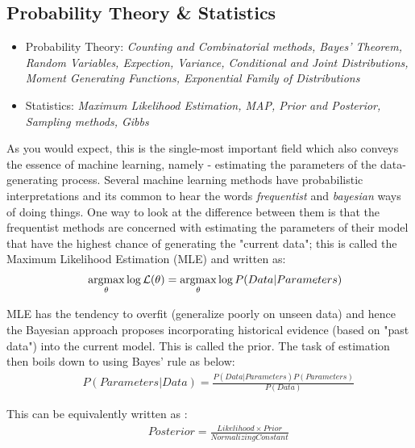 \documentclass[a4paper]{article}
\begin{document}
\subsection{Probability Theory \& Statistics}
\begin{itemize}
\item Probability Theory: \textit{Counting and Combinatorial methods, Bayes' Theorem, Random Variables, Expection, Variance, Conditional and Joint Distributions, Moment Generating Functions, Exponential Family of Distributions}
\item Statistics: \textit{Maximum Likelihood Estimation, MAP, Prior and Posterior, Sampling methods, Gibbs}
\end{itemize}
As you would expect, this is the single-most important field which also conveys the essence of machine learning, namely - estimating the parameters of the data-generating process. Several machine learning methods have probabilistic interpretations and its common to hear the words {\it frequentist} and {\it bayesian} ways of doing things. One way to look at the difference between them is that the frequentist methods are concerned with estimating the parameters of their model that have the highest chance of generating the "current data"; this is called the Maximum Likelihood Estimation (MLE) and written as: \\

\begin{equation} \label{eq:1}
\begin{aligned}
&& \underset{\theta}{\operatorname{argmax}} \log {\cal L } (\theta) = \underset{\theta}{\operatorname{argmax}} \log P(Data|Parameters)
\end{aligned}
\end{equation}


\noindent  MLE has the tendency to overfit (generalize poorly on unseen data) and hence the Bayesian approach proposes incorporating historical evidence (based on "past data") into the current model. This is called the prior. The task of estimation then boils down to using Bayes' rule as below: \\

\begin{equation} \label{eq:2}
\begin{aligned}
& & P (Parameters|Data) = \frac{ P(Data|Parameters) P(Parameters)}{P(Data)}
\end{aligned}
\end{equation}

\noindent This can be equivalently written as : \\
\begin{equation} \label{eq:3}
\begin{aligned}
& & Posterior = \frac{ Likelihood \times Prior}{Normalizing Constant}
\end{aligned}
\end{equation}
\end{document}
